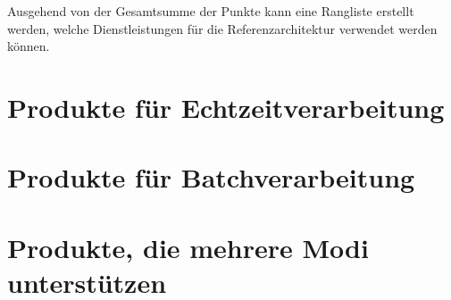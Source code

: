 Ausgehend von der Gesamtsumme der Punkte kann eine Rangliste erstellt werden, welche Dienstleistungen für die Referenzarchitektur verwendet werden können.



\section{Produkte für Echtzeitverarbeitung}\label{produkte:echtzeit}



\section{Produkte für Batchverarbeitung}



\section{Produkte, die mehrere Modi unterstützen}



